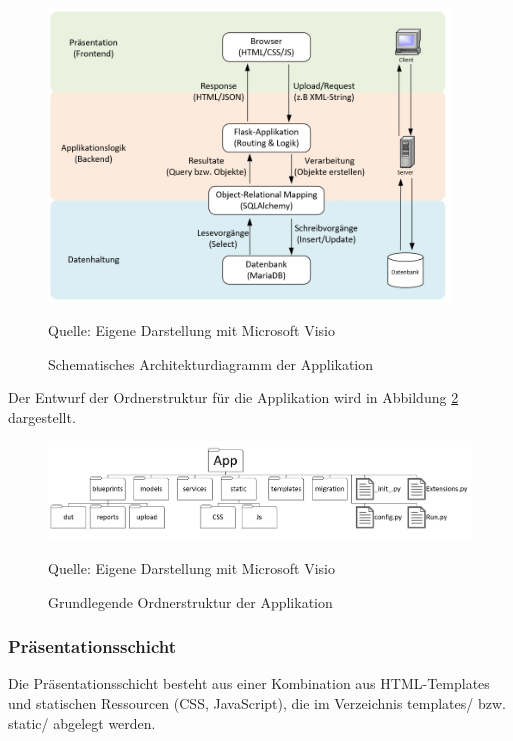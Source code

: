 \begin{figure}[H]
    \centering
    \includegraphics[width=0.95\textwidth]{Grafiken/Architekturdiagramm}
    \caption{Schematisches Architekturdiagramm der Applikation}
    \label{fig:arch_minimal}
    {Quelle: Eigene Darstellung mit Microsoft Visio}
\end{figure}

Der Entwurf der Ordnerstruktur für die Applikation wird in Abbildung \ref{fig: Grundlegende Ordnerstruktur der Applikation} dargestellt.

\begin{figure}[H]
    \centering
    \includegraphics[width=1\textwidth]{Grafiken/Minimale Ordnerstruktur Projekt}
    \caption{Grundlegende Ordnerstruktur der Applikation}
    \label{fig: Grundlegende Ordnerstruktur der Applikation}
    {Quelle: Eigene Darstellung mit Microsoft Visio}
\end{figure}

\subsubsection{Präsentationsschicht}


Die Präsentationsschicht besteht aus einer Kombination aus HTML-Templates und statischen Ressourcen (CSS, JavaScript),
die im Verzeichnis templates/ bzw. static/ abgelegt werden.

